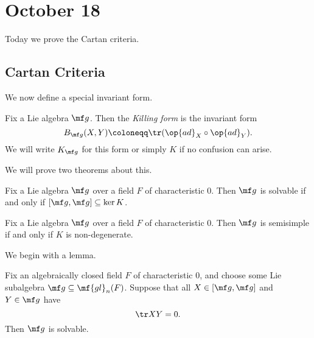 \documentclass[../notes.tex]{subfiles}
\begin{document}
\section{October 18}
Today we prove the Cartan criteria.

\subsection{Cartan Criteria}
We now define a special invariant form.
\begin{definition}
	Fix a Lie algebra $\mf g$. Then the \textit{Killing form} is the invariant form
	\[B_{\mf g}(X,Y)\coloneqq\tr({\op{ad}_X}\circ{\op{ad}_Y}).\]
	We will write $K_{\mf g}$ for this form or simply $K$ if no confusion can arise.
\end{definition}
We will prove two theorems about this.
\begin{theorem} \label{thm:cartan-solvable}
	Fix a Lie algebra $\mf g$ over a field $F$ of characteristic $0$. Then $\mf g$ is solvable if and only if $[\mf g,\mf g]\subseteq\ker K$.
\end{theorem}
\begin{theorem} \label{thm:cartain-semisimple}
	Fix a Lie algebra $\mf g$ over a field $F$ of characteristic $0$. Then $\mf g$ is semisimple if and only if $K$ is non-degenerate.
\end{theorem}
We begin with a lemma.
\begin{lemma}
	Fix an algebraically closed field $F$ of characteristic $0$, and choose some Lie subalgebra $\mf g\subseteq\mf{gl}_n(F)$. Suppose that all $X\in[\mf g,\mf g]$ and $Y\in\mf g$ have
	\[\tr XY=0.\]
	Then $\mf g$ is solvable.
\end{lemma}
\end{document}
